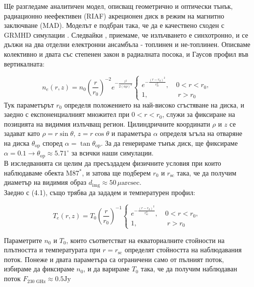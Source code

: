 \documentclass[12pt]{article}
\numberwithin{equation}{section}
\numberwithin{figure}{section}
\begin{document}
	Ще разгледаме аналитичен модел, описващ геометрично и оптически тънък, радиационно неефективен (RIAF) акреционен диск в режим на магнитно заключване (MAD). Моделът е подбран така, че да е качествено сходен с GRMHD симулации \cite{Yuan2003}. Следвайки \cite{Broderick2021}, \cite{Gold2020} приемаме, че излъчването е синхотронно, и се дължи на два отделни електронни ансамбъла - топлинен и не-топлинен. Описваме колективно и двата със степенен закон в радиалната посока, и Гаусов профил във вертикалната:
	
	\begin{equation}
		n_e(r,z) = n_0\left(\frac{r}{r_0}\right)^{-2}e^{-\frac{z^2}{2(\alpha\rho)^2}}
		\begin{cases}
			e^{-\frac{(r-r_0)^2}{r^2_{\text{sc}}}},\quad 0 < r < r_0,\\
			1,\,\,\qquad\qquad r>r_0
		\end{cases}
	\end{equation}
	Тук параметърът $r_0$ определя положението на най-високо сгъстяване на диска, и заедно с експоненциалният множител при $0 < r < r_0$, служи за фиксиране на позицията на видимия излъчващ регион. Цилиндричните координати $\rho$ и $z$ се задават като $\rho = r\sin\theta$, $z = r\cos\theta$ и параметъра $\alpha$ определя ъгъла на отваряне на диска $\theta_{\text{op}}$ според $\alpha = \tan\theta_\text{op}$. За да генерираме тънък диск, ще фиксираме $\alpha = 0.1 \rightarrow \theta_{\text{op}}\approx 5.71^\circ$ за всички наши симулации.\\
	В изследванията си целим да пресъздадем физичните условия при които наблюдаваме обекта M87$^*$, и затова ще подберем $r_0$ и $r_\text{sc}$ така, че да получим диаметър на видимия образ $d_\text{img}\approx 50\, \mu\text{arcsec}$.\\
	
	Заедно с (4.1), също трябва да зададем и температурен профил:
	
	\begin{equation}
		T_e(r,z) = T_0\left(\frac{r}{r_0}\right)^{-1}
		\begin{cases}
			e^{-\frac{(r-r_0)^2}{r^2_{\text{sc}}}},\quad 0 < r < r_0,\\
			1,\,\,\qquad\qquad r>r_0
		\end{cases}
	\end{equation}
	
	Параметрите $n_0$ и $T_0$, които съответстват на екваториалните стойности на плътността и температурата при $r = r_\text{sc}$ определят стойността на наблюдавания поток. Понеже и двата параметъра са ограничени само от пълният поток, избираме да фиксираме $n_0$, и да варираме $T_0$ така, че да получим наблюдаван поток $F_{\text{230 GHz}} \approx 0.5 \text{Jy}$\\
	
\end{document}
